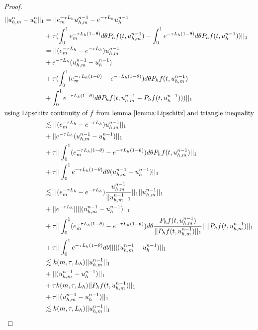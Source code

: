 \begin{proof}
    \begin{align*}
        ||u_{h,m}^n - u_{h}^n||_1 &= ||e_m^{-\tau L_h}u_{h,m}^{n-1} - e^{-\tau L_h}u_{h}^{n-1}\\
        & + \tau(\int^1_0e_m^{-\tau L_h(1-\theta)}d\theta P_hf(t, u_{h,m}^{n-1}) - \int^1_0e^{-\tau L_h(1-\theta)}d\theta P_hf(t, u_{h}^{n-1}))||_1\\
        &= ||(e_m^{-\tau L_h}-e^{-\tau L_h})u_{h,m}^{n-1} \\
        & + e^{-\tau L_h}(u_{h,m}^{n-1}-u_{h}^{n-1})\\
        & + \tau(\int^1_0 (e_m^{-\tau L_h(1-\theta)}-e^{-\tau L_h(1-\theta)}) d\theta P_hf(t, u_{h,m}^{n-1})\\
        & + \int^1_0e^{-\tau L_h(1-\theta)}d\theta P_hf(t, u_{h,m}^{n-1}- P_hf(t, u_{h}^{n-1})))||_1\\
        \intertext{using Lipschitz continuity of $f$ from lemma \ref{lemma:Lipschitz} and triangle inequality}
        & \lesssim ||(e_m^{-\tau L_h}-e^{-\tau L_h})u_{h,m}^{n-1}||_1 \\
        & + ||e^{-\tau L_h}(u_{h,m}^{n-1}-u_{h}^{n-1})||_1 \\
        & + \tau||\int^1_0 (e_m^{-\tau L_h(1-\theta)}-e^{-\tau L_h(1-\theta)}) d\theta P_hf(t, u_{h,m}^{n-1})||_1 \\
        & + \tau||\int^1_0e^{-\tau L_h(1-\theta)}d\theta (u_{h,m}^{n-1}- u_{h}^{n-1})||_1 \\
        & \lesssim ||(e_m^{-\tau L_h}-e^{-\tau L_h})\frac{u_{h,m}^{n-1}}{||u_{h,m}^{n-1}||_1}||_1||u_{h,m}^{n-1}||_1 \\
        & + ||e^{-\tau L_h}||||(u_{h,m}^{n-1}-u_{h}^{n-1})||_1 \\
        & + \tau||\int^1_0 (e_m^{-\tau L_h(1-\theta)}-e^{-\tau L_h(1-\theta)}) d\theta \frac{P_hf(t, u_{h,m}^{n-1})}{|| P_hf(t, u_{h,m}^{n-1})||_1}|||| P_hf(t, u_{h,m}^{n-1})||_1 \\
        & + \tau||\int^1_0e^{-\tau L_h(1-\theta)}d\theta|||| (u_{h,m}^{n-1}- u_{h}^{n-1})||_1 \\
        & \lesssim k(m,\tau, L_h)||u_{h,m}^{n-1}||_1 \\
        & + ||(u_{h,m}^{n-1}-u_{h}^{n-1})||_1 \\
        & + \tau k(m,\tau, L_h)|| P_hf(t, u_{h,m}^{n-1})||_1 \\
        & + \tau||(u_{h,m}^{n-1}- u_{h}^{n-1})||_1 \\
        & \lesssim k(m,\tau, L_h)||u_{h,m}^{n-1}||_1 \\

\end{align*}
\end{proof}
